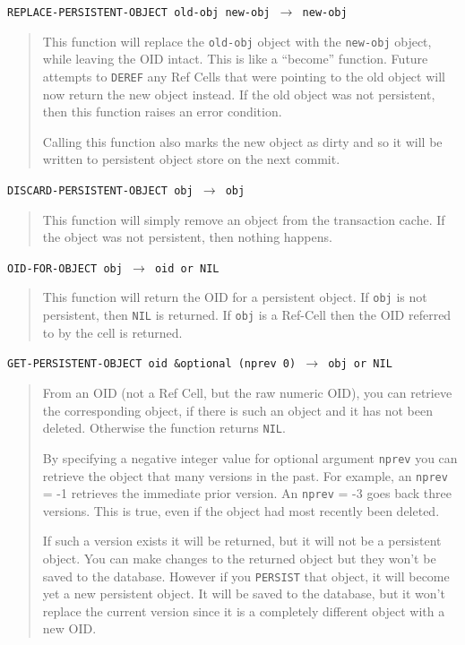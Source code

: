 \documentclass[article,oneside]{memoir}
\begin{document}
\noindent \texttt{REPLACE-PERSISTENT-OBJECT old-obj new-obj $\rightarrow$ new-obj}

\begin{quote}
This function will replace the \texttt{old-obj} object with the \texttt{new-obj} object, while leaving the OID intact. This is like a ``become'' function. Future attempts to \texttt{DEREF} any Ref Cells that were pointing to the old object will now return the new object instead. If the old object was not persistent, then this function raises an error condition.

Calling this function also marks the new object as dirty and so it will be written to persistent object store on the next commit.
\end{quote}

\noindent \texttt{DISCARD-PERSISTENT-OBJECT obj $\rightarrow$ obj}

\begin{quote}
This function will simply remove an object from the transaction cache. If the object was not persistent, then nothing happens.
\end{quote}

\noindent \texttt{OID-FOR-OBJECT obj $\rightarrow$ oid or NIL}

\begin{quote}
This function will return the OID for a persistent object. If \texttt{obj} is not persistent, then \texttt{NIL} is returned. If \texttt{obj} is a Ref-Cell then the OID referred to by the cell is returned.
\end{quote}


\noindent \texttt{GET-PERSISTENT-OBJECT oid \&optional (nprev 0) $\rightarrow$ obj or NIL}

\begin{quote}
From an OID (not a Ref Cell, but the raw numeric OID), you can retrieve the corresponding object, if there is such an object and it has not been deleted. Otherwise the function returns \texttt{NIL}.

By specifying a negative integer value for optional argument \texttt{nprev}  you can retrieve the object that many versions in the past. For example, an \texttt{nprev} = -1 retrieves the immediate prior version. An \texttt{nprev} = -3 goes back three versions. This is true, even if the object had most recently been deleted.

If such a version exists it will be returned, but it will not be a persistent object. You can make changes to the returned object but  they won't be saved to the database. However if you \texttt{PERSIST} that object, it will become yet a new persistent object. It will be saved to the database, but it won't replace the current version since it is a completely different object with a new OID.
\end{quote}
\end{document}
